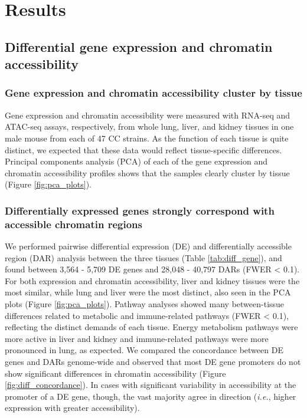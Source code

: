 \documentclass[9pt,twocolumn,twoside]{gsajnl}
\newcommand{\ie}{\emph{i.e.}\xspace}
\begin{document}
\section{Results}

\subsection{Differential gene expression and chromatin accessibility}

\subsubsection{Gene expression and chromatin accessibility cluster by tissue}
Gene expression and chromatin accessibility were measured with RNA-seq and ATAC-seq assays, respectively, from whole lung, liver, and kidney tissues in one male mouse from each of 47 CC strains. As the function of each tissue is quite distinct, we expected that these data would reflect tissue-specific differences. Principal components analysis (PCA) of each of the gene expression and chromatin accessibility profiles shows that the samples clearly cluster by tissue (Figure \ref{fig:pca_plots}). 

\subsubsection{Differentially expressed genes strongly correspond with accessible chromatin regions} 
We performed pairwise differential expression (DE) and differentially accessible region (DAR) analysis between the three tissues (Table \ref{tab:diff_gene}), and found between 3,564 - 5,709 DE genes and 28,048 - 40,797 DARs (FWER < 0.1). For both expression and chromatin accessibility, liver and kidney tissues were the most similar, while lung and liver were the most distinct, also seen in the PCA plots (Figure \ref{fig:pca_plots}). Pathway analyses showed many between-tissue differences related to metabolic and immune-related pathways (FWER < 0.1), reflecting the distinct demands of each tissue. Energy metabolism pathways were more active in liver and kidney and immune-related pathways were more pronounced in lung, as expected. We compared the concordance between DE genes and DARs genome-wide and observed that most DE gene promoters do not show significant differences in chromatin accessibility (Figure \ref{fig:diff_concordance}). In cases with significant variability in accessibility at the promoter of a DE gene, though, the vast majority agree in direction (\ie, higher expression with greater accessibility).
\end{document}
